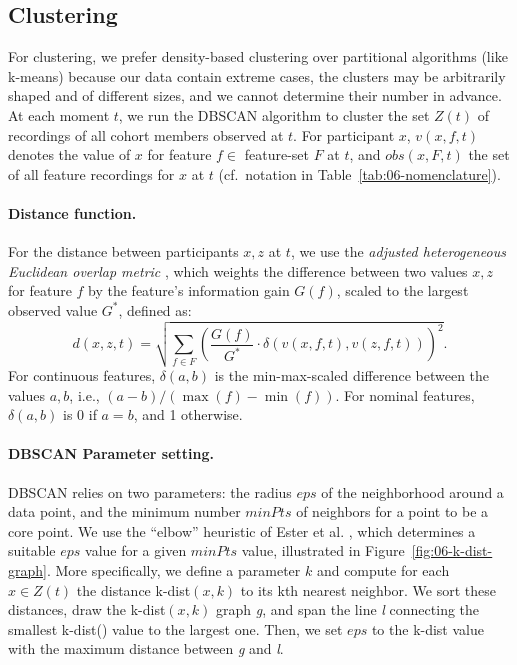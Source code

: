 \documentclass[
  oneside]{book}
\begin{document}
\hypertarget{evo-concept-clustering}{%
\subsection{Clustering}\label{evo-concept-clustering}}

For clustering, we prefer density-based clustering over partitional algorithms (like k-means) because our data contain extreme cases, the clusters may be arbitrarily shaped and of different sizes, and we cannot determine their number in advance.
At each moment \(t\), we run the DBSCAN \autocite{EsterEtAl:DBSCAN96} algorithm to cluster the set \(Z(t)\) of recordings of all cohort members observed at \(t\).
For participant \(x\), \(v(x,f,t)\) denotes the value of \(x\) for feature \(f\in\) feature-set \(F\) at \(t\), and \(obs(x,F,t)\) the set of all feature recordings for \(x\) at \(t\) (cf.~notation in Table~\ref{tab:06-nomenclature}).

\paragraph*{Distance function.}

For the distance between participants \(x,z\) at \(t\), we use the \emph{adjusted heterogeneous Euclidean overlap metric} \autocite{HielscherEtAl:IDA14,Wilson97}, which weights the difference between two values \(x,z\) for feature \(f\) by the feature's information gain \(G(f)\), scaled to the largest observed value \(G^*\), defined as:
\begin{equation}
d(x,z,t)=\sqrt{\sum_{f \in F} \left(\frac{G(f)}{G^*}\cdot \delta\left(v(x,f,t),v(z,f,t)\right)\right)^2}.
\label{eq:heom-adjusted}
\end{equation}
For continuous features, \(\delta(a,b)\) is the min-max-scaled difference between the values \(a,b\), i.e., \((a-b)/(\max(f)-\min(f))\).
For nominal features, \(\delta(a,b)\) is 0 if \(a=b\), and 1 otherwise.

\paragraph*{DBSCAN Parameter setting.}

DBSCAN relies on two parameters: the radius \(eps\) of the neighborhood around a data point, and the minimum number \(minPts\) of neighbors for a point to be a core point.
We use the ``elbow'' heuristic of Ester et al. \autocite{EsterEtAl:DBSCAN96}, which determines a suitable \(eps\) value for a given \(minPts\) value, illustrated in Figure~\ref{fig:06-k-dist-graph}.
More specifically, we define a parameter \(k\) and compute for each \(x\in{}Z(t)\) the distance k-dist\((x,k)\) to its kth nearest neighbor.
We sort these distances, draw the k-dist\((x,k)\) graph \emph{g}, and span the line \emph{l} connecting the smallest k-dist() value to the largest one.
Then, we set \(eps\) to the k-dist value with the maximum distance between \emph{g} and \emph{l}.
\end{document}
